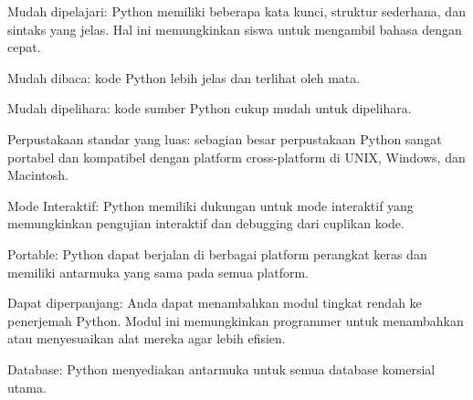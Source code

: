 \noindent 
{\fontsize{14pt}{14pt}\selectfont Mudah dipelajari: Python memiliki beberapa kata kunci, struktur sederhana, dan sintaks yang jelas. Hal ini memungkinkan siswa untuk mengambil bahasa dengan cepat. \\} \par
\vspace{14pt}
\noindent 
{\fontsize{14pt}{14pt}\selectfont Mudah dibaca: kode Python lebih jelas dan terlihat oleh mata. \\} \par
\vspace{14pt}
\noindent 
{\fontsize{14pt}{14pt}\selectfont Mudah dipelihara: kode sumber Python cukup mudah untuk dipelihara. \\} \par
\vspace{14pt}
\noindent 
{\fontsize{14pt}{14pt}\selectfont Perpustakaan standar yang luas: sebagian besar perpustakaan Python sangat portabel dan kompatibel dengan platform cross-platform di UNIX, Windows, dan Macintosh. \\} \par
\noindent 
{\fontsize{14pt}{14pt}\selectfont Mode Interaktif: Python memiliki dukungan untuk mode interaktif yang memungkinkan pengujian interaktif dan debugging dari cuplikan kode. \\} \par
\vspace{14pt}
\noindent 
{\fontsize{14pt}{14pt}\selectfont Portable: Python dapat berjalan di berbagai platform perangkat keras dan memiliki antarmuka yang sama pada semua platform. \\} \par
\vspace{14pt}
\noindent 
{\fontsize{14pt}{14pt}\selectfont Dapat diperpanjang: Anda dapat menambahkan modul tingkat rendah ke penerjemah Python. Modul ini memungkinkan programmer untuk menambahkan atau menyesuaikan alat mereka agar lebih efisien. \\} \par
\vspace{14pt}
\noindent 
{\fontsize{14pt}{14pt}\selectfont Database: Python menyediakan antarmuka untuk semua database komersial utama. \\} \par
\vspace{14pt}
\vspace{14pt}
\noindent 
